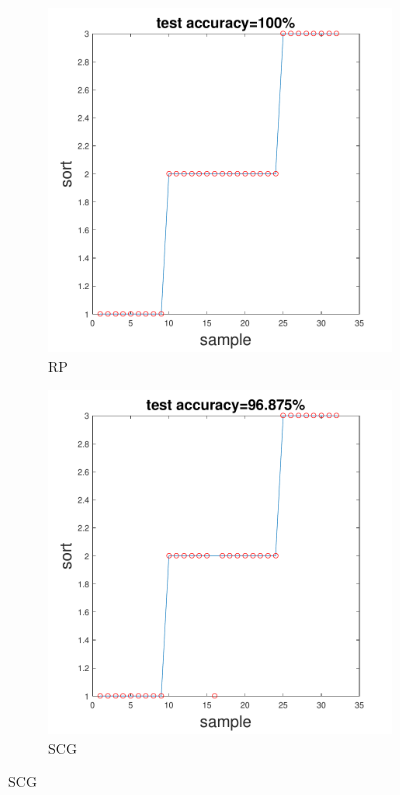 \documentclass[12pt,a4paper]{article}
\begin{document}
\begin{CJK}{UTF8}{bsmi}
\begin{enumerate}
\begin{enumerate}
	 	\begin{figure}[H]
	 		\centering
	 		\begin{subfigure}{.5\textwidth}
	 			\centering
	 			\includegraphics[width=1.05\linewidth]{wine_rp}
	 			\caption{RP}
	 			
	 		\end{subfigure}%
	 		\begin{subfigure}{.5\textwidth}
	 			\centering
	 			\includegraphics[width=1.05\linewidth]{wine_scg}
	 			\caption{SCG}
	 			

\end{subfigure}
\end{figure}
\end{enumerate}
\end{enumerate}
\end{CJK}
\end{document}
